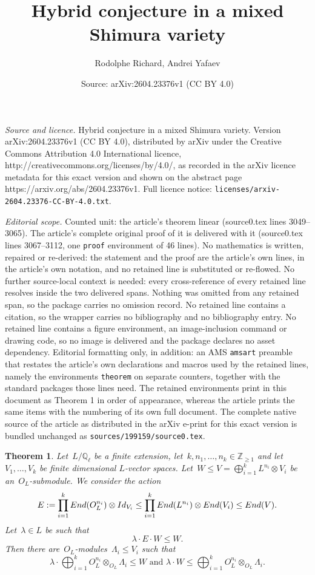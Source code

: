 \documentclass[10pt,a4paper]{amsart}
\title{Hybrid conjecture in a mixed Shimura variety}
\author{Rodolphe Richard, Andrei Yafaev}
\date{Source: arXiv:2604.23376v1 (CC BY 4.0)}
\newtheorem{theorem}{Theorem}
\newcommand{\End}{{\rm End}}
\newcommand{\Q}{{\mathbb Q}}
\newcommand{\Z}{{\mathbb Z}}
\newcommand{\tens}{\otimes}
\begin{document}
\maketitle

\noindent\emph{Source and licence.} Hybrid conjecture in a mixed Shimura variety. Version arXiv:2604.23376v1 (CC BY 4.0), distributed by arXiv under the Creative Commons Attribution 4.0 International licence, http://creativecommons.org/licenses/by/4.0/, as recorded in the arXiv licence metadata for this exact version and shown on the abstract page https://arxiv.org/abs/2604.23376v1. Full licence notice: \texttt{licenses/arxiv-2604.23376-CC-BY-4.0.txt}.\par\smallskip

\noindent\textit{Editorial scope.} Counted unit: the article's theorem linear (source0.tex lines 3049--3065). The article's complete original proof of it is delivered with it (source0.tex lines 3067--3112, one \texttt{proof} environment of 46 lines). No mathematics is written, repaired or re-derived: the statement and the proof are the article's own lines, in the article's own notation, and no retained line is substituted or re-flowed.  No further source-local context is needed: every cross-reference of every retained line resolves inside the two delivered spans.  Nothing was omitted from any retained span, so the package carries no omission record.  No retained line contains a citation, so the wrapper carries no bibliography and no bibliography entry.  No retained line contains a figure environment, an image-inclusion command or drawing code, so no image is delivered and the package declares no asset dependency.  Editorial formatting only, in addition: an AMS \texttt{amsart} preamble that restates the article's own declarations and macros used by the retained lines, namely the environments \texttt{theorem} on separate counters, together with the standard packages those lines need.  The retained environments print in this document as Theorem 1 in order of appearance, whereas the article prints the same items with the numbering of its own full document.  The complete native source of the article as distributed in the arXiv e-print for this exact version is bundled unchanged as \texttt{sources/199159/source0.tex}.
\begin{theorem}\label{thm:split linear}
Let~$L/\Q_\ell$ be a finite extension, let~$k,n_1,\ldots,n_k\in\Z_{\geq1}$ and let~$V_1,\ldots,V_k$ be finite dimensional $L$-vector spaces.
Let~$W\leq V= \bigoplus_{i=1}^k L^{n_i}\tens V_i$ be an~$O_L$-submodule.  We consider the action
\[
E:=\prod_{i=1}^k \End(O_L^{n_i})\tens Id_{V_i}\leq \prod_{i=1}^k\End(L^{n_i})\tens \End(V_i)\leq \End(V).
\]
Let~$\lambda\in L$ be such that
\[
\lambda \cdot E\cdot W\leq W.
\]
Then there are~$O_L$-modules~$\Lambda_i\leq V_i$ such that
\[
\lambda\cdot\bigoplus_{i=1}^k O_L^{n_i}\tens_{O_L} \Lambda_i\leq W
\text{ and }
\lambda\cdot W\leq \bigoplus_{i=1}^k O_L^{n_i}\tens_{O_L}\Lambda_i.
\]
\end{theorem}
\end{document}
